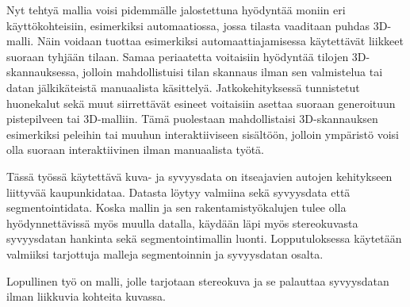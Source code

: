 Nyt tehtyä mallia voisi pidemmälle jalostettuna hyödyntää moniin eri käyttökohteisiin, esimerkiksi automaatiossa, jossa tilasta vaaditaan puhdas 3D-malli.  
Näin voidaan tuottaa esimerkiksi automaattiajamisessa käytettävät liikkeet suoraan tyhjään tilaan.  
Samaa periaatetta voitaisiin hyödyntää tilojen 3D-skannauksessa,  
jolloin mahdollistuisi tilan skannaus ilman sen valmistelua tai datan jälkikäteistä manuaalista käsittelyä.  
Jatkokehityksessä tunnistetut huonekalut sekä muut siirrettävät esineet voitaisiin asettaa suoraan generoituun pistepilveen tai 3D-malliin.  
Tämä puolestaan mahdollistaisi 3D-skannauksen esimerkiksi peleihin tai muuhun interaktiiviseen sisältöön,  
jolloin ympäristö voisi olla suoraan interaktiivinen ilman manuaalista työtä.  

Tässä työssä käytettävä kuva- ja syvyysdata on itseajavien autojen kehitykseen liittyvää kaupunkidataa.  
Datasta löytyy valmiina sekä syvyysdata että segmentointidata.  
Koska mallin ja sen rakentamistyökalujen tulee olla hyödynnettävissä myös muulla datalla,  
käydään läpi myös stereokuvasta syvyysdatan hankinta sekä segmentointimallin luonti.  
Lopputuloksessa käytetään valmiiksi tarjottuja malleja segmentoinnin ja syvyysdatan osalta.  

Lopullinen työ on malli, jolle tarjotaan stereokuva ja se palauttaa syvyysdatan ilman liikkuvia kohteita kuvassa.  
